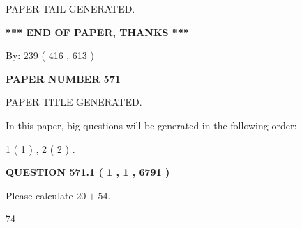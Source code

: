 \documentclass[12pt]{article}
\begin{document}
   
   
\vspace{2.0in} PAPER TAIL GENERATED.
   
   
   
   
\vspace{1.0in} 
{\textbf{\large{ *** END OF PAPER, THANKS *** }}} 
   
   
\hspace{1.0in} By: 
 239 ( 416 ,  613 )
   
   
   
   
\newpage 
\setcounter{page}{ 
   571001 } 
   
   
   
   
 {\textbf{ \Large{ PAPER NUMBER  571  }}}
   
   
\vspace{0.2in}
   
   
   
   
   
   
   
   
 \vspace{0.2in}
 
 
 
 
   
   
 PAPER TITLE GENERATED.
   
   
   
\vspace{0.2in}
   
In this paper, big questions will be generated in the following order: 
   
   
   1 ( 1 )
 ,
   2 ( 2 )
 .
  
\vspace{0.2in}
  
{\textbf{\Large{QUESTION
571.1 
 ( 1 , 1 , 6791 )
}}}
  
  
 
Please calculate $ %
20 +  %
54 $.
 
 
 
\noindent{}
 
 

74
 
 
\noindent{}
 
 

 
 
 
\noindent{}
 
\end{document}
